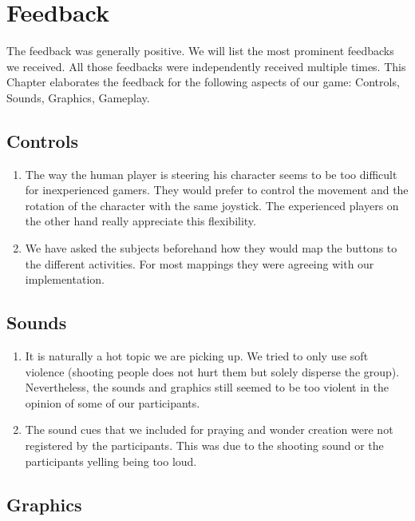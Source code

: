 \documentclass[11pt,a4paper,titlepage,table]{article}
\begin{document}
\section{Feedback}
\raggedright
The feedback was generally positive. We will list the most prominent feedbacks we received. All those feedbacks were independently received multiple times. This Chapter elaborates the feedback for the following aspects of our game: Controls, Sounds, Graphics, Gameplay.

	\subsection{Controls}
	
\begin{enumerate}
\item The way the human player is steering his character seems to be too difficult for inexperienced gamers. They would prefer to control the movement and the rotation of the character with the same joystick. The experienced players on the other hand really appreciate this flexibility. 
\item We have asked the subjects beforehand how they would map the buttons to the different activities. For most mappings they were agreeing with our implementation.
\end{enumerate}	
	
	\subsection{Sounds}
	
	\begin{enumerate}
\item It is naturally a hot topic we are picking up. We tried to only use soft violence (shooting people does not hurt them but solely disperse the group). Nevertheless, the sounds and graphics still seemed to be too violent in the opinion of some of our participants.
\item The sound cues that we included for praying and wonder creation were not registered by the participants. This was due to the shooting sound or the participants yelling being too loud.
\end{enumerate}
	\subsection{Graphics}
	
\end{document}
